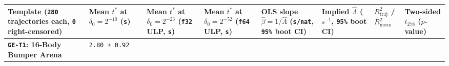 \documentclass[10pt,letterpaper]{article}
\begin{document}
{\scriptsize\setlength{\tabcolsep}{2.4pt}\renewcommand{\arraystretch}{1.12}
\begin{longtable}[]{@{}
  >{\raggedright\arraybackslash}p{}
  >{\raggedleft\arraybackslash}p{}
  >{\raggedleft\arraybackslash}p{}
  >{\raggedleft\arraybackslash}p{}
  >{\raggedleft\arraybackslash}p{}
  >{\raggedleft\arraybackslash}p{}
  >{\raggedleft\arraybackslash}p{}
  >{\raggedleft\arraybackslash}p{}@{}}
\toprule\noalign{}
\begin{minipage}[b]{\linewidth}\raggedright
\textbf{Template (\texttt{280} trajectories each, \texttt{0}
right-censored)}
\end{minipage} & \begin{minipage}[b]{\linewidth}\raggedleft
\textbf{Mean \(t^*\) at \(\delta_0 = 2^{-10}\) (\texttt{s})}
\end{minipage} & \begin{minipage}[b]{\linewidth}\raggedleft
\textbf{Mean \(t^*\) at \(\delta_0 = 2^{-23}\) (\texttt{f32} ULP,
\texttt{s})}
\end{minipage} & \begin{minipage}[b]{\linewidth}\raggedleft
\textbf{Mean \(t^*\) at \(\delta_0 = 2^{-52}\) (\texttt{f64} ULP,
\texttt{s})}
\end{minipage} & \begin{minipage}[b]{\linewidth}\raggedleft
\textbf{OLS slope \(\hat{\beta} = 1/\hat{\Lambda}\) (\texttt{s/nat},
\texttt{95\%} boot CI)}
\end{minipage} & \begin{minipage}[b]{\linewidth}\raggedleft
\textbf{Implied \(\hat{\Lambda}\) (\(\text{s}^{-1}\), \texttt{95\%} boot
CI)}
\end{minipage} & \begin{minipage}[b]{\linewidth}\raggedleft
\textbf{\(R^2_{\text{traj}}\) / \(R^2_{\text{mean}}\)}
\end{minipage} & \begin{minipage}[b]{\linewidth}\raggedleft
\textbf{Two-sided \(t_{278}\) (\(p\)-value)}
\end{minipage} \\
\midrule\noalign{}
\endhead
\bottomrule\noalign{}
\endlastfoot
\textbf{\texttt{GE-T1}: 16-Body Bumper Arena} & \texttt{2.\allowbreak{}80\ ±\ 0.\allowbreak{}92} &

\end{longtable}}
\end{document}
